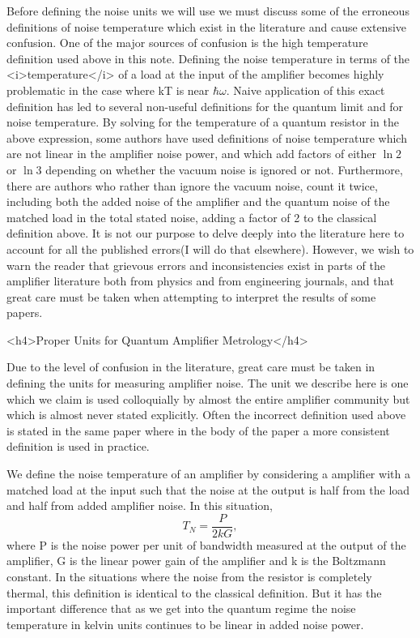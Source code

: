 \documentclass[11pt]{article}
\begin{document}
    	Before defining the noise units we will use we must discuss some of the erroneous definitions of noise temperature which exist in the literature and cause extensive confusion.  One of the major sources of confusion is the high temperature definition used above in this note.  Defining the noise temperature in terms of the <i>temperature</i> of a load at the input of the amplifier becomes highly problematic in the case where kT is near $\hbar\omega$.  Naive application of this exact definition has led to several non-useful definitions for the quantum limit and for noise temperature.  By solving for the temperature of a quantum resistor in the above expression, some authors have used definitions of noise temperature which are not linear in the amplifier noise power, and which add factors of either $\ln{2}$ or $\ln{3}$ depending on whether the vacuum noise is ignored or not.  Furthermore, there are authors who rather than ignore the vacuum noise, count it twice, including both the added noise of the amplifier and the quantum noise of the matched load in the total stated noise, adding a factor of 2 to the classical definition above.  It is not our purpose to delve deeply into the literature here to account for all the published errors(I will do that elsewhere).   However, we wish to warn the reader that grievous errors and inconsistencies exist in parts of the amplifier literature both from physics and from engineering journals, and that great care must be taken when attempting to interpret the results of some papers.  

<h4>Proper Units for Quantum Amplifier Metrology</h4>




    	Due to the level of confusion in the literature, great care must be taken in defining the units for measuring amplifier noise.  The unit we describe here is one which we claim is used colloquially by almost the entire amplifier community but which is almost never stated explicitly.  Often the incorrect definition used above is stated in the same paper where in the body of the paper a more consistent definition is used in practice.  





    	We define the noise temperature of an amplifier by considering a amplifier with a matched load at the input such that the noise at the output is half from the load and half from added amplifier noise.  In this situation, 
$$T_N = \frac{P}{2kG},$$
	where P is the noise power per unit of bandwidth measured at the output of the amplifier, G is the linear power gain of the amplifier and k is the Boltzmann constant.   In the situations where the noise from the resistor is completely thermal, this definition is identical to the classical definition.  But it has the important difference that as we get into the quantum regime the noise temperature in kelvin units continues to be linear in added noise power.  
\end{document}
